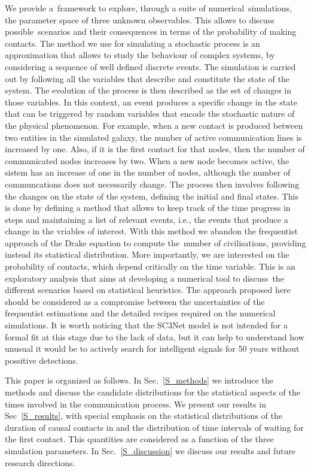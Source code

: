 \documentclass[crop]{CSLB}
\begin{document}
We provide a framework to explore, through a suite of
numerical simulations, the parameter space of three unknown
observables.
%
This allows to discuss possible scenarios and their consequences in
terms of the probability of making contacts.
%
The method we use for simulating a stochastic process is an
approximation that allows to study the behaviour of complex systems,
by considering a sequence of well defined discrete events.
%
The simulation is carried out by following all the variables that
describe and constitute the state of the system.
%
The evolution of the process is then described as the set of changes
in those variables. 
%
In this context, an event produces a specific change in the state that
can be triggered by random variables that encode the stochastic nature
of the physical phenomenon.
%
For example, when a new contact is produced between two entities in
the simulated galaxy, the number of active communication lines is
increased by one.
%
Also, if it is the first contact for that nodes, then the number of
communicated nodes increases by two.
%
When a new node becomes active, the sistem has an increase of one in
the number of nodes, although the number of communcations does not
necessarily change.
%
The process then involves following the changes on the state of the
system, defining the initial and final states.
%
This is done by defining a method that allows to keep track of the
time progress in steps and maintaining a list of relevant events,
i.e., the events that produce a change in the vriables of interest.
%
With this method we abandon the frequentist approach of the Drake
equation to compute the number of civilisations, providing instead its
statistical distribution.
%
More importantly, we are interested on the probability of contacts,
which depend critically on the time variable.
%
This is an exploratory analysis that aims at developing a numerical
tool to discuss the different scenarios based on statistical
heuristics.
%
The approach proposed here should be considered as a compromise
between the uncertainties of the frequentist estimations and the
detailed recipes required on the numerical simulations.
%
It is worth noticing that the SC3Net model is not intended for a
formal fit at this stage due to the lack of data, but it can help to
understand how unusual it would be to actively search for intelligent
signals for 50 years without possitive detections.


This paper is organized as follows.
%
In Sec.~\ref{S_methods} we introduce the methods and discuss the
candidate distributions for the statistical aspects of the times
involved in the communication process.
%
We present our results in Sec~\ref{S_results}, with special emphasis
on the statistical distributions of the duration of causal contacts in
and the distribution of time intervals of waiting for the first
contact.
%
This quantities are considered as a function of the three simulation
parameters.
%
In Sec.~\ref{S_discussion} we discuss our results and future research
directions.   
\end{document}
